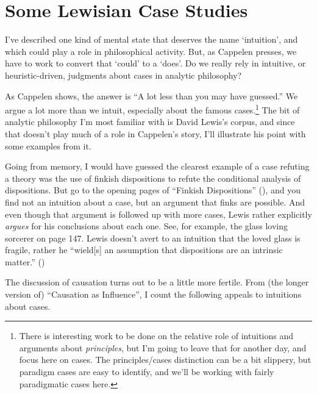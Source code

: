 \documentclass[
  11pt,
  letterpaper,
  DIV=11,
  numbers=noendperiod,
  twoside]{scrartcl}
\begin{document}
\section{Some Lewisian Case Studies}\label{sec-Lewis}

I've described one kind of mental state that deserves the name
`intuition', and which could play a role in philosophical activity. But,
as Cappelen presses, we have to work to convert that `could' to a
`does'. Do we really rely in intuitive, or heuristic-driven, judgments
about cases in analytic philosophy?

As Cappelen shows, the answer is ``A lot less than you may have
guessed.'' We argue a lot more than we intuit, especially about the
famous cases.\footnote{There is interesting work to be done on the
  relative role of intuitions and arguments about \emph{principles}, but
  I'm going to leave that for another day, and focus here on cases. The
  principles/cases distinction can be a bit slippery, but paradigm cases
  are easy to identify, and we'll be working with fairly paradigmatic
  cases here.} The bit of analytic philosophy I'm most familiar with is
David Lewis's corpus, and since that doesn't play much of a role in
Cappelen's story, I'll illustrate his point with some examples from it.

Going from memory, I would have guessed the clearest example of a case
refuting a theory was the use of finkish dispositions to refute the
conditional analysis of dispositions. But go to the opening pages of
``Finkish Dispositions'' (), and
you find not an intuition about a case, but an argument that finks are
possible. And even though that argument is followed up with more cases,
Lewis rather explicitly \emph{argues} for his conclusions about each
one. See, for example, the glass loving sorcerer on page 147. Lewis
doesn't avert to an intuition that the loved glass is fragile, rather he
``wield{[}s{]} an assumption that dispositions are an intrinsic
matter.'' ()

The discussion of causation turns out to be a little more fertile. From
(the longer version of) ``Causation as Influence'', I count the
following appeals to intuitions about cases.
\end{document}
